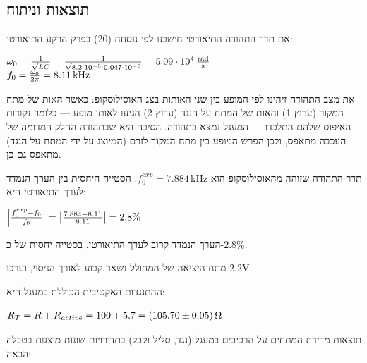 \documentclass[14pt]{extarticle}
\makeatletter
\newenvironment{lefteqs}{%
    \begin{english}%
    \begin{flushleft}%
    \renewcommand{\arraystretch}{1.3}%
    $\begin{array}{@{}l@{}}%
}{%
    \end{array}$%
    \end{flushleft}%
    \end{english}%
}
\makeatother
\begin{document}
\subsection*{תוצאות וניתוח}
את תדר התהודה התיאורטי חישבנו לפי נוסחה (20) בפרק הרקע התיאורטי:
\begin{lefteqs}
    \omega_0 = \frac{1}{\sqrt{LC}} = \frac{1}{\sqrt{8.2 \cdot 10^{-3} \cdot 0.047 \cdot 10^{-6}}} = 5.09 \cdot 10^{4}\,\frac{\text{rad}}{\text{s}} \\
    f_0 = \frac{\omega_0}{2\pi} = 8.11\,\text{kHz}
\end{lefteqs}

את מצב התהודה זיהינו לפי המופע בין שני האותות בצג האוסילוסקופ: כאשר האות של מתח המקור (ערוץ 1) והאות של המתח על הנגד (ערוץ 2) הגיעו לאותו מופע — כלומר נקודות האיפוס שלהם התלכדו — המעגל נמצא בתהודה. הסיבה היא שבתהודה החלק המדומה של העכבה מתאפס, ולכן הפרש המופע בין מתח המקור לזרם (המיוצג על ידי המתח על הנגד) מתאפס גם כן.

תדר התהודה שזוהה מהאוסילוסקופ הוא $f_0^{exp} = 7.884\,\text{kHz}$. הסטייה היחסית בין הערך הנמדד לערך התיאורטי היא:
\begin{lefteqs}
    \left|\frac{f_0^{exp} - f_0}{f_0}\right| = \left|\frac{7.884 - 8.11}{8.11}\right| = 2.8\%
\end{lefteqs}
הערך הנמדד קרוב לערך התיאורטי, בסטייה יחסית של כ-$2.8\%$.

מתח היציאה של המחולל נשאר קבוע לאורך הניסוי, וערכו $2.2 \text{V}$.

ההתנגדות האקטיבית הכוללת במעגל היא:
\begin{lefteqs}
    R_T = R + R_{active} = 100 + 5.7 = (105.70 \pm 0.05) \,\Omega
\end{lefteqs}

תוצאות מדידת המתחים על הרכיבים במעגל (נגד, סליל וקבל) בתדירויות שונות מוצגות בטבלה הבאה:
\end{document}
